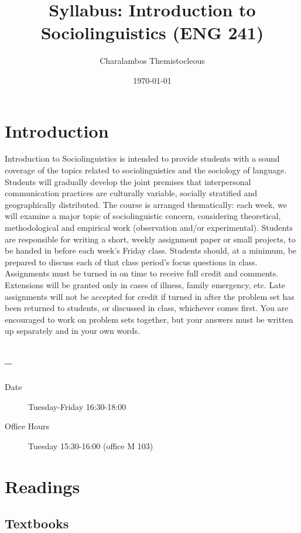 \documentclass[listof=flat,letterpaper,11pt,abstract=true]{article}
\title{Syllabus: Introduction to Sociolinguistics (ENG 241)}
\author{Charalambos Themistocleous}
\date{\today}
\begin{document}
\maketitle


\section{Introduction}
\label{sec-1}

Introduction to Sociolinguistics is intended to provide students with a sound coverage of the topics related to sociolinguistics and the sociology of language. Students will gradually develop the joint premises that interpersonal communication practices are culturally variable, socially stratified and geographically distributed.
The course is arranged thematically: each week, we will examine a major topic of sociolinguistic concern, considering theoretical, methodological and empirical work (observation and/or experimental). Students are responsible for writing a short, weekly assignment paper or small projects, to be handed in before each week’s Friday class. Students should, at a minimum, be prepared to discuss each of that class period’s focus questions in class.
Assignments must be turned in on time to receive full credit and comments. Extensions will be granted only in cases of illness, family emergency, etc. Late assignments will not be accepted for credit if turned in after the problem set has been returned to students, or discussed in class, whichever comes first. You are encouraged to work on problem sets together, but your answers must be written up separately and in your own words.
\subsection{--}
\label{sec-1-1}

\begin{description}
\item[Date] Tuesday-Friday 16:30-18:00
\item[Office Hours] Tuesday 15:30-16:00 (office M 103)
\end{description}
\section{Readings}
\label{sec-2}
\subsection{Textbooks}
\label{sec-2-1}
\end{document}

